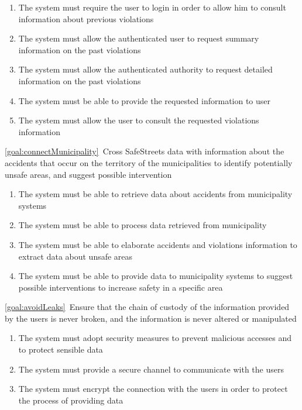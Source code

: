\begin{description}
			\begin{enumerate}[resume*]
   				\item The system must require the user to login in order to allow him to consult information about previous violations
   				\item The system must allow the authenticated user to request summary information on the past violations
   				\item The system must allow the authenticated authority to request detailed information on the past violations
   				\item The system must be able to provide the requested information to user
   				\item The system must allow the user to consult the requested violations information
  			\end{enumerate}
		\item \ref{goal:connectMunicipality}\ Cross SafeStreets data with information about the accidents that occur on the territory of the municipalities to identify potentially unsafe areas, and suggest possible intervention
			\begin{enumerate}[resume*]
   				\item The system must be able to retrieve data about accidents from municipality systems 
   				\item The system must be able to process data retrieved from municipality
   				\item The system must be able to elaborate accidents and violations information to extract data about unsafe areas
   				\item The system must be able to provide data to municipality systems to suggest possible interventions to increase safety in a specific area
  			\end{enumerate}
  		\item \ref{goal:avoidLeaks}\ Ensure that the chain of custody of the information provided by the users is never broken, and the information is never altered or manipulated
  			\begin{enumerate}[resume*]
  				\item The system must adopt security measures to prevent malicious accesses and to protect sensible data
   				\item The system must provide a secure channel to communicate with the users
   				\item The system must encrypt the connection with the users in order to protect the process of providing data
  			\end{enumerate}

\end{description}
